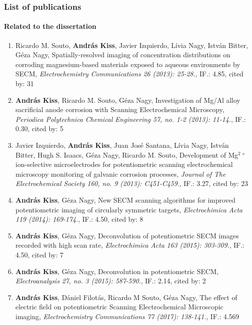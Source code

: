 \documentclass{beamer}
\begin{document}
\begin{frame}
\frametitle{List of publications}
\framesubtitle{Related to the dissertation}
\tiny
\begin{enumerate}
\item Ricardo M. Souto, \textbf{András Kiss}, Javier Izquierdo, Lívia Nagy, István Bitter, Géza Nagy, Spatially-resolved imaging of concentration distributions on corroding mag\-ne\-si\-um-based materials exposed to aqueous environments by SECM, \emph{Electrochemistry Communications 26 (2013): 25-28.}, IF.: 4.85, cited by: 31

\item \textbf{András Kiss}, Ricardo M. Souto, Géza Nagy, Investigation of Mg/Al alloy sacrificial anode corrosion with Scanning Electrochemical Microscopy, \emph{Periodica Polytechnica Chemical Engineering 57, no. 1-2 (2013): 11-14.}, IF.: 0.30, cited by: 5

\item Javier Izquierdo, \textbf{András Kiss}, Juan José Santana, Lívia Nagy, István Bitter, Hugh S. Isaacs, Géza Nagy, Ricardo M. Souto, Development of Mg$^{2+}$ ion-selective microelectrodes for potentiometric scanning electrochemical microscopy monitoring of galvanic corrosion processes, \emph{Journal of The Electrochemical Society 160, no. 9 (2013): C451-C459.}, IF.: 3.27, cited by: 23

\item \textbf{András Kiss}, Géza Nagy, New SECM scanning algorithms for improved potentiometric imaging of circularly symmetric targets, \emph{Electrochimica Acta 119 (2014): 169-174.}, IF.: 4.50, cited by: 8

\item \textbf{András Kiss}, Géza Nagy, Deconvolution of potentiometric SECM images recorded with high scan rate, \emph{Electrochimica Acta 163 (2015): 303-309.}, IF.: 4.50, cited by: 7

\item \textbf{András Kiss}, Géza Nagy, Deconvolution in potentiometric SECM, \emph{Electroanalysis 27, no. 3 (2015): 587-590.}, IF.: 2.14, cited by: 2

\item \textbf{András Kiss}, Dániel Filotás, Ricardo M Souto, Géza Nagy, The effect of electric field on potentiometric Scanning Electrochemical Microscopic imaging, \emph{Electrochemistry Communications 77 (2017): 138-141.}, IF.: 4.569
\end{enumerate}
\end{frame}
\end{document}
